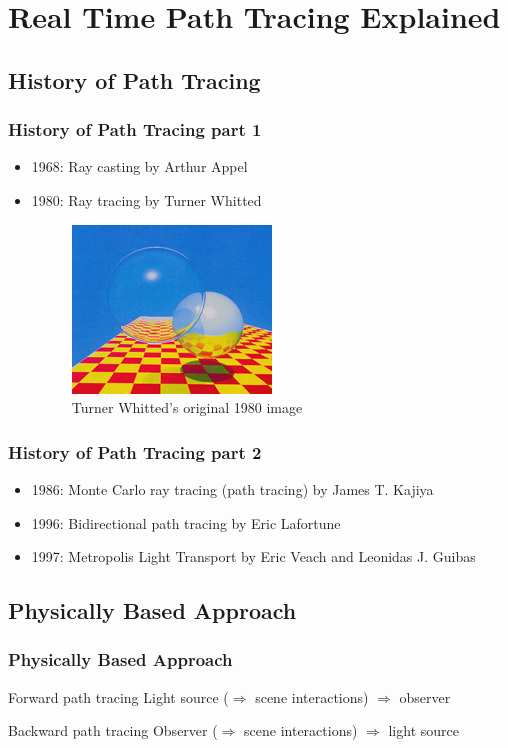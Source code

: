 \documentclass{beamer}
\begin{document}
\section{Real Time Path Tracing Explained}

\subsection{History of Path Tracing}
\begin{frame}
    \frametitle{History of Path Tracing part 1}
    \begin{itemize}
        \item 1968: Ray casting by Arthur Appel
        \item 1980: Ray tracing by Turner Whitted
        \begin{figure}[H]
            \includegraphics[scale=0.8]{early-raytracing-whitted}
            \centering
            \caption{Turner Whitted's original 1980 image}
        \end{figure}
    \end{itemize}
\end{frame}

\begin{frame}
    \frametitle{History of Path Tracing part 2}
    \begin{itemize}
        \item 1986: Monte Carlo ray tracing (path tracing) by James T. Kajiya
        \item 1996: Bidirectional path tracing by Eric Lafortune
        \item 1997: Metropolis Light Transport by Eric Veach and Leonidas J. Guibas
    \end{itemize}
\end{frame}

\subsection{Physically Based Approach}
\begin{frame}
    \frametitle{Physically Based Approach}
    \begin{block}{Forward path tracing}
        Light source (\(\Rightarrow\) scene interactions) \(\Rightarrow\) observer
    \end{block}
    \begin{block}{Backward path tracing}
        Observer (\(\Rightarrow\) scene interactions) \(\Rightarrow\) light source
    \end{block}
\end{frame}
\end{document}
